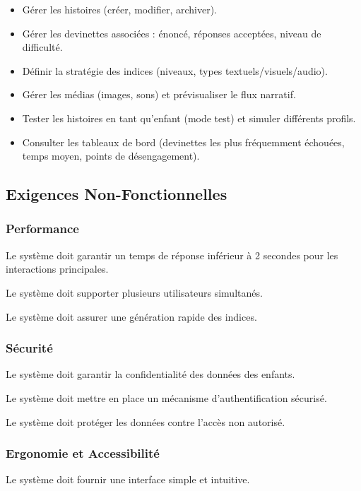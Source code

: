 \documentclass[12pt,a4paper]{article}
\begin{document}
\begin{itemize}
    \item Gérer les histoires (créer, modifier, archiver).
    \item Gérer les devinettes associées : énoncé, réponses acceptées, niveau de difficulté.
    \item Définir la stratégie des indices (niveaux, types textuels/visuels/audio).
    \item Gérer les médias (images, sons) et prévisualiser le flux narratif.
    \item Tester les histoires en tant qu'enfant (mode test) et simuler différents profils.
    \item Consulter les tableaux de bord (devinettes les plus fréquemment échouées, temps moyen, points de désengagement).
\end{itemize}

\subsection{Exigences Non-Fonctionnelles}

\subsubsection{Performance}

Le système doit garantir un temps de réponse inférieur à 2 secondes pour les interactions principales.

Le système doit supporter plusieurs utilisateurs simultanés.

Le système doit assurer une génération rapide des indices.

\subsubsection{Sécurité}

Le système doit garantir la confidentialité des données des enfants.

Le système doit mettre en place un mécanisme d'authentification sécurisé.

Le système doit protéger les données contre l'accès non autorisé.

\subsubsection{Ergonomie et Accessibilité}

Le système doit fournir une interface simple et intuitive.
\end{document}

